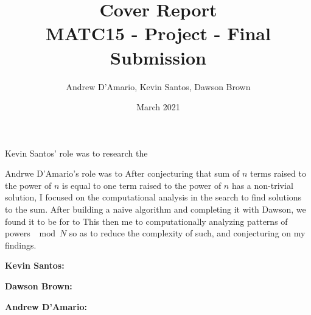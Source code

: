 \documentclass{article}
\title{Cover Report \\ \vspace{.3in} \large{MATC15 - Project - Final Submission}}
\author{Andrew D'Amario, Kevin Santos, Dawson Brown}
\date{March 2021}
\begin{document}
\maketitle

\begin{flushleft}



Kevin Santos' role was to research the     

Andrwe D'Amario's role was to  After conjecturing that sum of $n$ terms raised to the power of $n$ is equal to one term raised to the power of $n$ has a non-trivial solution, I focused on the computational analysis in the search to find solutions to the sum. After building a naive algorithm and completing it with Dawson, we found it to be for to This then me to computationally analyzing patterns of powers $\mod N$ so as to reduce the complexity of such, and conjecturing on my findings.


\vspace{.2in}
{\bf Kevin Santos: }

\vspace{.2in}
{\bf Dawson Brown: }

\vspace{.2in}
{\bf Andrew D'Amario: }  

\end{flushleft}
\end{document}
